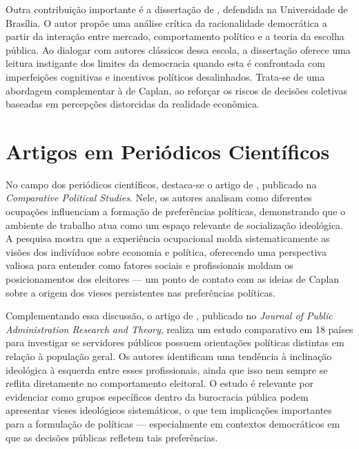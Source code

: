 Outra contribuição importante é a dissertação de , defendida na Universidade de Brasília. O autor propõe uma análise crítica da racionalidade democrática a partir da interação entre mercado, comportamento político e a teoria da escolha pública. Ao dialogar com autores clássicos dessa escola, a dissertação oferece uma leitura instigante dos limites da democracia quando esta é confrontada com imperfeições cognitivas e incentivos políticos desalinhados. Trata-se de uma abordagem complementar à de Caplan, ao reforçar os riscos de decisões coletivas baseadas em percepções distorcidas da realidade econômica.

\section{Artigos em Periódicos Científicos}

No campo dos periódicos científicos, destaca-se o artigo de , publicado na \textit{Comparative Political Studies}. Nele, os autores analisam como diferentes ocupações influenciam a formação de preferências políticas, demonstrando que o ambiente de trabalho atua como um espaço relevante de socialização ideológica. A pesquisa mostra que a experiência ocupacional molda sistematicamente as visões dos indivíduos sobre economia e política, oferecendo uma perspectiva valiosa para entender como fatores sociais e profissionais moldam os posicionamentos dos eleitores — um ponto de contato com as ideias de Caplan sobre a origem dos vieses persistentes nas preferências políticas.

Complementando essa discussão, o artigo de , publicado no \textit{Journal of Public Administration Research and Theory}, realiza um estudo comparativo em 18 países para investigar se servidores públicos possuem orientações políticas distintas em relação à população geral. Os autores identificam uma tendência à inclinação ideológica à esquerda entre esses profissionais, ainda que isso nem sempre se reflita diretamente no comportamento eleitoral. O estudo é relevante por evidenciar como grupos específicos dentro da burocracia pública podem apresentar vieses ideológicos sistemáticos, o que tem implicações importantes para a formulação de políticas — especialmente em contextos democráticos em que as decisões públicas refletem tais preferências.
